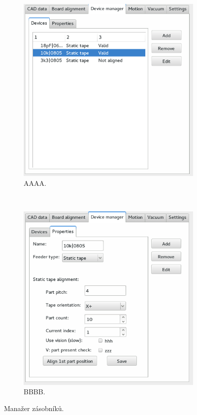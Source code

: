 \begin{figure}[h!]
	\centering
	\begin{subfigure}[b]{0.48\linewidth}
		\centering
		\includegraphics[width=1\linewidth]{obrazky/sw3.png}%
		\caption{AAAA.}
		\label{fig:denni}
	\end{subfigure}
	~
	\begin{subfigure}[b]{0.48\linewidth}
		\centering
		\includegraphics[width=1\linewidth]{obrazky/sw2.png}%
		\caption{BBBB.}
		\label{fig:denni2}
	\end{subfigure}

	\caption{Manažer zásobníků.}
\end{figure}


